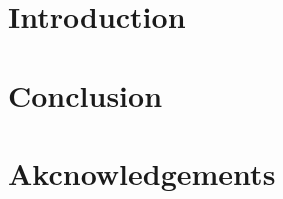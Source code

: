 \documentclass{msc}
\begin{document}
\makeauthors
\makeabstract
\paperkeywords
\maketitle


\section{Introduction}

\section{Conclusion}

\section*{Akcnowledgements}
\acknowledge




\clearpage
\appendix
\end{document}

